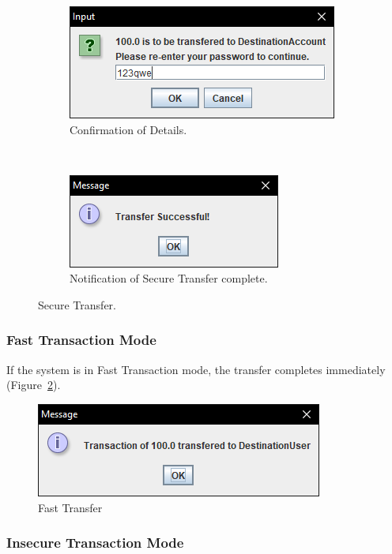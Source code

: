 \documentclass[12pt,twocolumn]{IEEEtran}
\begin{document}
\begin{figure}[h!]
	\centering
	\begin{subfigure}[t]{0.5\textwidth}
		\centering
		\includegraphics[width=0.8\linewidth]{./Resources/secureConfirm.PNG}
		\caption{Confirmation of Details.}
	\end{subfigure}%
	~ 
	\begin{subfigure}[t]{0.5\textwidth}
		\centering
		\includegraphics[width=0.8\linewidth]{./Resources/successSecure.PNG}
		\caption{Notification of Secure Transfer complete.}
	\end{subfigure}
	\caption{Secure Transfer.} \label{fig:secure}
\end{figure}

\subsubsection{Fast Transaction Mode}

If the system is in Fast Transaction mode, the transfer completes immediately (Figure~\ref{fig:fast}).

\begin{figure}[h!]
	\centering
	\includegraphics[width=0.4\linewidth]{./Resources/successFast.PNG}
	\caption{Fast Transfer} \label{fig:fast}
\end{figure}

\subsubsection{Insecure Transaction Mode}
\end{document}
